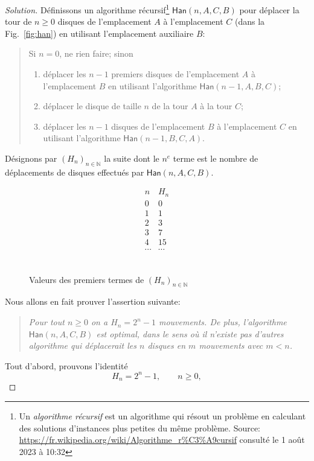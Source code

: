 \documentclass[french,course,oneside,theoremnosection]{lecture}
\newcommand{\N}{\mathbb{N}}
\begin{document}
\begin{proof}[Solution]
Définissons un algorithme récursif\footnote{Un \emph{algorithme récursif} est un algorithme qui résout un problème en calculant des solutions d'instances plus petites du même problème. Source: \url{https://fr.wikipedia.org/wiki/Algorithme_r\%C3\%A9cursif} consulté le 1 août 2023 à 10:32  } $\mathsf{Han}(n, A, C, B)$ pour déplacer la tour de $n\geq 0$ disques de l'emplacement $A$ à l'emplacement $C$ (dans la Fig.~\ref{fig:han}) en utilisant l'emplacement auxiliaire $B$:
\begin{quotation}
\noindent Si $n=0$, ne rien faire; sinon
\begin{enumerate}
\item déplacer les $n-1$ premiers disques de l'emplacement $A$ à l'emplacement $B$ en utilisant l'algorithme $\mathsf{Han}(n-1, A, B, C)$;
\item déplacer le disque de taille $n$ de la tour $A$ à la tour $C$;
\item déplacer les $n-1$ disques de l'emplacement $B$ à l'emplacement $C$ en utilisant l'algorithme $\mathsf{Han}(n-1, B, C, A)$.
\end{enumerate}
\end{quotation}
Désignons par $(H_n)_{n\in \N}$ la suite dont le $n^{e}$ terme est le nombre de déplacements de disques effectués par $\mathsf{Han}(n,A,C,B)$. 
\begin{figure}
\[\begin{array}{c|c}
n & H_n\\ \hline
0 & 0\\
1 & 1\\
2 & 3\\
3 & 7\\
4 & 15\\
\cdots & \cdots
\end{array}\]
~\caption{Valeurs des premiers termes de $(H_n)_{n\in  \N}$}\label{fig:hannb}
\end{figure}
Nous allons en fait prouver l'assertion suivante:
\begin{quotation}\itshape
Pour tout $n\geq 0$ on a $H_n=2^{n}-1$ mouvements. De plus, l'algorithme $\mathsf{Han}(n,A,C,B)$ est optimal, dans le sens où il n'existe pas d'autres algorithme qui déplacerait les $n$ disques en $m$ mouvements avec $m<n$.
\end{quotation}
Tout d'abord, prouvons l'identité
\begin{equation}\label{eqn:dfm}
H_n=2^n-1,\qquad n\geq 0,
\end{equation}

\end{proof}
\end{document}
